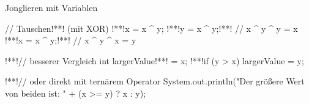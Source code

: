 \resetframecounters
\begin{frame}[fragile]{Jonglieren mit Variablen}\onslide<+->%
    \vspace{-0.5\baselineskip}
    \begin{solve}
    \begin{plainjava}
// Tauschen!*\onslide<+->*! (mit XOR)
!*\onslide<+->*!x = x ^ y;
!*\onslide<+->*!y = x ^ y;!*\onslide<+->*! // x ^ y ^ y = x
!*\onslide<+->*!x = x ^ y;!*\onslide<+->*! // x ^ y ^ x = y

!*\onslide<+->*!// besserer Vergleich
int largerValue!*\onslide<+->*! = x;
!*\onslide<+->*!if (y > x) largerValue = y;

!*\onslide<+->*!// oder direkt mit ternärem Operator
System.out.println("Der größere Wert von beiden ist: " + (x >= y) ? x : y);
    \end{plainjava}
    \end{solve}
\end{frame}